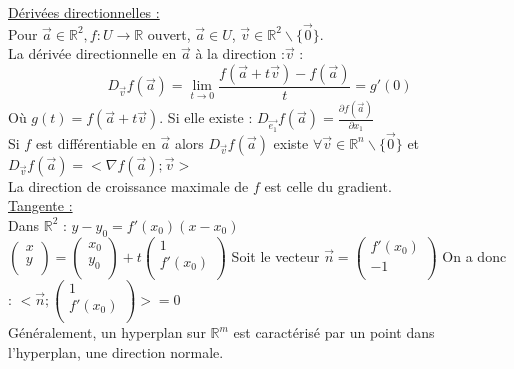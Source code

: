 \documentclass[../main.tex]{subfiles}
\begin{document}
\quad \underline{Dérivées directionnelles :}\\
Pour $\vec{a} \in \mathbb{R}^2, f:U\rightarrow \mathbb{R}$ ouvert, $\vec{a} \in U$, $\vec{v} \in \mathbb{R}^2\backslash \{\vec{0}\}$. \\
La dérivée directionnelle en $\vec{a}$ à la direction :$\vec{v}$ : \\
\begin{equation}
    D_{\vec{v}} f(\vec{a}) = \lim_{t\rightarrow 0} \frac{f(\vec{a}+t\vec{v}) - f(\vec{a})}{t} = g'(0)
\end{equation}
Où $g(t) = f(\vec{a}+t\vec{v})$. Si elle existe : $D_{\vec{e_1}} f(\vec{a}) = \frac{\partial f(\vec{a})}{\partial x_1}$\\

Si $f$ est différentiable en $\vec{a}$ alors $D_{\vec{v}} f(\vec{a})$ existe $\forall \vec{v} \in \mathbb{R}^n\backslash \{\vec{0}\}$ et $D_{\vec{v}} f(\vec{a}) = <\nabla f(\vec{a}); \vec{v}>$\\
La direction de croissance maximale de $f$ est celle du gradient.\\

\quad \underline{Tangente :}\\
Dans $\mathbb{R}^2$ : $y-y_0 = f'(x_0)(x-x_0)$\\
$\begin{pmatrix}
    x\\
    y\\
\end{pmatrix} = \begin{pmatrix}
    x_0\\
    y_0\\
\end{pmatrix} + t\begin{pmatrix}
    1\\
    f'(x_0)\\
\end{pmatrix}$
Soit le vecteur $\vec{n} = \begin{pmatrix}
    f'(x_0)\\
    -1\\
\end{pmatrix}$
On a donc : $<\vec{n}; \begin{pmatrix}
    1\\
    f'(x_0)\\
\end{pmatrix}> = 0$\\

Généralement, un hyperplan sur $\mathbb{R}^m$ est caractérisé par un point dans l'hyperplan, une direction normale.\\
\end{document}
